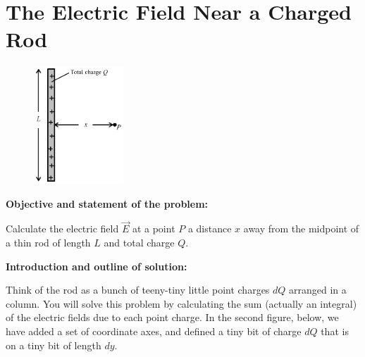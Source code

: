 \section{The Electric Field Near a Charged Rod}

\makelabheader %

\begin{figure}
\vspace{-.25in}
    \includegraphics[width=0.3\textwidth]{electric_field_near_a_charged_rod/fig1.eps}
\end{figure}

\vspace{1cm}

\textbf{Objective and statement of the problem:}

Calculate the electric field $\vec{E}$ at a point $P$ a distance $x$ away from the midpoint of a thin rod
of length $L$ and total charge $Q$.

\vspace{1cm}

\textbf{Introduction and outline of solution:}

Think of the rod as a bunch of teeny-tiny little point charges $dQ$ arranged in a column. You will solve this problem by calculating the sum (actually an integral) of the electric fields due to each point charge.  In the second figure, below, we have added a set of coordinate axes, and defined a tiny bit of charge $dQ$ that is on a tiny bit of length $dy$.  
\par

